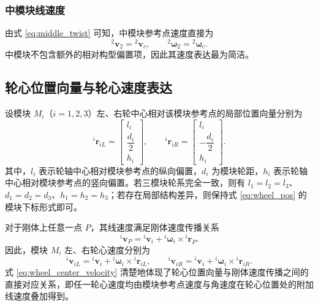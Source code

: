 \subsubsection{中模块线速度}

由式 \eqref{eq:middle_twist} 可知，中模块参考点速度直接为
\begin{equation}
{}^{2}\mathbf v_2={}^2\mathbf v_c,
\qquad
{}^{2}\boldsymbol\omega_2={}^2\boldsymbol\omega_c.
\label{eq:v2_body}
\end{equation}
中模块不包含额外的相对构型偏置项，因此其速度表达最为简洁。

\subsection{轮心位置向量与轮心速度表达}

设模块 $M_i$（$i=1,2,3$）左、右轮中心相对该模块参考点的局部位置向量分别为
\begin{equation}
{}^{i}\mathbf r_{iL}=
\begin{bmatrix}
l_i\\
\dfrac{d_i}{2}\\
h_i
\end{bmatrix},
\qquad
{}^{i}\mathbf r_{iR}=
\begin{bmatrix}
l_i\\
-\dfrac{d_i}{2}\\
h_i
\end{bmatrix}.
\label{eq:wheel_pos}
\end{equation}
其中，$l_i$ 表示轮轴中心相对模块参考点的纵向偏置，$d_i$ 为模块轮距，$h_i$ 表示轮轴中心相对模块参考点的竖向偏置。若三模块轮系完全一致，则有 $l_1=l_2=l_3$、$d_1=d_2=d_3$、$h_1=h_2=h_3$；若存在局部结构差异，则保持式 \eqref{eq:wheel_pos} 的模块下标形式即可。

对于刚体上任意一点 $P$，其线速度满足刚体速度传播关系
\begin{equation}
{}^{i}\mathbf v_P
=
{}^{i}\mathbf v_i
+
{}^{i}\boldsymbol\omega_i\times {}^{i}\mathbf r_P.
\label{eq:rigid_propagation}
\end{equation}
因此，模块 $M_i$ 左、右轮心速度分别为
\begin{equation}
{}^{i}\mathbf v_{iL}
=
{}^{i}\mathbf v_i
+
{}^{i}\boldsymbol\omega_i\times {}^{i}\mathbf r_{iL},
\qquad
{}^{i}\mathbf v_{iR}
=
{}^{i}\mathbf v_i
+
{}^{i}\boldsymbol\omega_i\times {}^{i}\mathbf r_{iR}.
\label{eq:wheel_center_velocity}
\end{equation}
式 \eqref{eq:wheel_center_velocity} 清楚地体现了轮心位置向量与刚体速度传播之间的直接对应关系，即任一轮心速度均由模块参考点速度与角速度在轮心位置处的附加线速度叠加得到。

